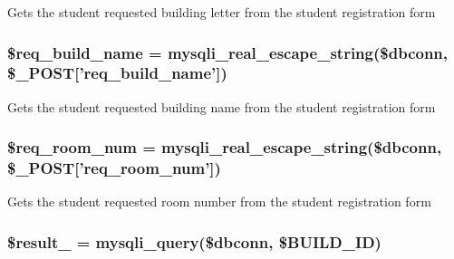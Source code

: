 \-Gets the student requested building letter from the student registration form \hypertarget{user__view_2validate_2studentVal_8php_ab1174bbcff9467a38d45e4938ed53d0c}{
\subsubsection[{\$req\-\_\-build\-\_\-name}]{\setlength{\rightskip}{0pt plus 5cm}\$req\-\_\-build\-\_\-name = mysqli\-\_\-real\-\_\-escape\-\_\-string(\$dbconn, \$\-\_\-\-P\-O\-S\-T\mbox{[}'req\-\_\-build\-\_\-name'\mbox{]})}}\label{user__view_2validate_2studentVal_8php_ab1174bbcff9467a38d45e4938ed53d0c}
\-Gets the student requested building name from the student registration form \hypertarget{user__view_2validate_2studentVal_8php_a03ada09603995a51dc132367698e687d}{
\subsubsection[{\$req\-\_\-room\-\_\-num}]{\setlength{\rightskip}{0pt plus 5cm}\$req\-\_\-room\-\_\-num = mysqli\-\_\-real\-\_\-escape\-\_\-string(\$dbconn, \$\-\_\-\-P\-O\-S\-T\mbox{[}'req\-\_\-room\-\_\-num'\mbox{]})}}\label{user__view_2validate_2studentVal_8php_a03ada09603995a51dc132367698e687d}
\-Gets the student requested room number from the student registration form \hypertarget{user__view_2validate_2studentVal_8php_a0b3f63d6f969a6ad92963ceae90afab9}{
\subsubsection[{\$result\-\_\-9}]{\setlength{\rightskip}{0pt plus 5cm}\$result\-\_ = mysqli\-\_\-query(\$dbconn, \$\-B\-U\-I\-L\-D\-\_\-\-I\-D)}}\label{user__view_2validate_2studentVal_8php_a0b3f63d6f969a6ad92963ceae90afab9}
